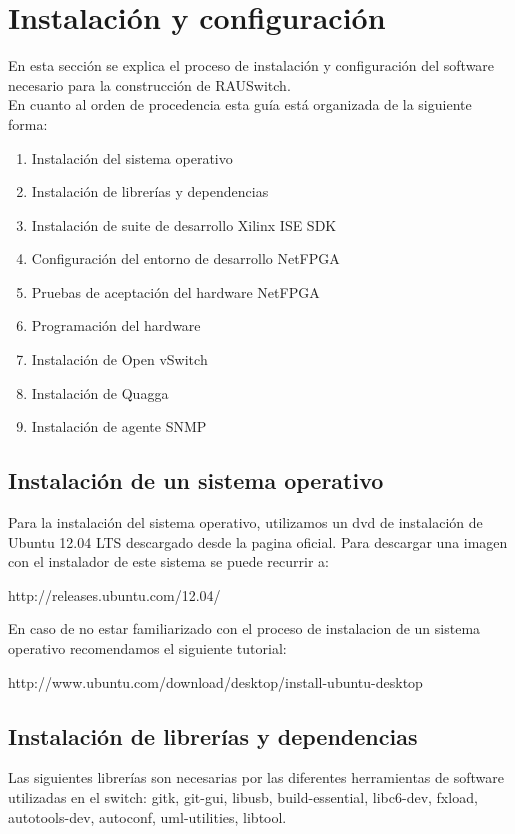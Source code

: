 \newpage
\section{Instalación y configuración}
En esta sección se explica el proceso de instalación y configuración del software necesario para la construcción de RAUSwitch.\\

En cuanto al orden de procedencia esta guía está organizada de la siguiente forma:

\begin{enumerate}
\item Instalación del sistema operativo
\item Instalación de librerías y dependencias
\item Instalación de suite de desarrollo Xilinx ISE SDK
\item Configuración del entorno de desarrollo NetFPGA
\item Pruebas de aceptación del hardware NetFPGA
\item Programación del hardware
\item Instalación de Open vSwitch
\item Instalaci\'on de Quagga
\item Instalaci\'on de agente SNMP
\end{enumerate}

\subsection{Instalación de un sistema operativo}
Para la instalaci\'on del sistema operativo, utilizamos un dvd de instalaci\'on de Ubuntu 12.04 LTS descargado desde la pagina oficial. Para descargar una imagen con el instalador de este sistema se puede recurrir a:

\begin{center}
http://releases.ubuntu.com/12.04/
\end{center}  

En caso de no estar familiarizado con el proceso de instalacion de un sistema operativo recomendamos el siguiente tutorial:

\begin{center}
http://www.ubuntu.com/download/desktop/install-ubuntu-desktop
\end{center}

\subsection{Instalación de librerías y dependencias}
Las siguientes librerías son necesarias por las diferentes herramientas de software utilizadas en el switch: gitk, git-gui, libusb, build-essential, libc6-dev, fxload, autotools-dev, autoconf, uml-utilities, libtool.\\

